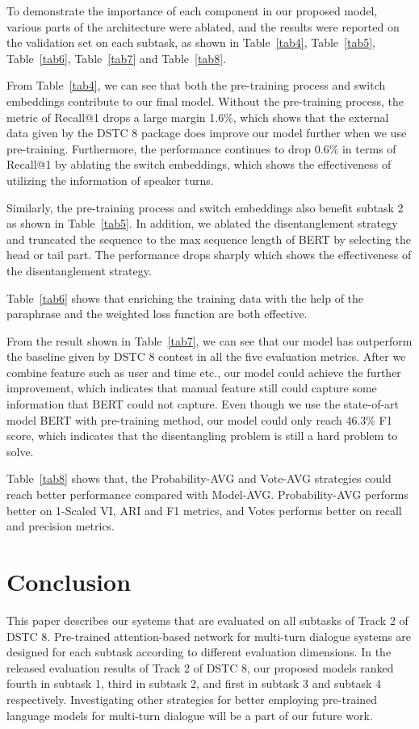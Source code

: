 \documentclass[letterpaper]{article} \usepackage{aaai20}  \usepackage{times}  \usepackage{helvet} \usepackage{courier}  \usepackage[hyphens]{url}  \usepackage{graphicx} \urlstyle{rm} \def\UrlFont{\rm}  \usepackage{graphicx}  \frenchspacing  \setlength{\pdfpagewidth}{8.5in}  \setlength{\pdfpageheight}{11in}
\begin{document}
    To demonstrate the importance of each component in our proposed model, various parts of the architecture were ablated, and the results were reported on the validation set on each subtask, as shown in Table~\ref{tab4}, Table~\ref{tab5}, Table~\ref{tab6}, Table~\ref{tab7} and Table~\ref{tab8}.

    From Table~\ref{tab4}, we can see that both the pre-training process and switch embeddings contribute to our final model.
    Without the pre-training process, the metric of Recall@1 drops a large margin 1.6\%, which shows that the external data given by the DSTC 8 package does improve our model further when we use pre-training.
    Furthermore, the performance continues to drop 0.6\% in terms of Recall@1 by ablating the switch embeddings, which shows the effectiveness of utilizing the information of speaker turns.

    Similarly, the pre-training process and switch embeddings also benefit subtask 2 as shown in Table~\ref{tab5}.
    In addition, we ablated the disentanglement strategy and truncated the sequence to the max sequence length of BERT by selecting the head or tail part.
    The performance drops sharply which shows the effectiveness of the disentanglement strategy.


    Table~\ref{tab6} shows that enriching the training data with the help of the paraphrase and the weighted loss function are both effective.

    From the result shown in Table~\ref{tab7}, we can see that our model has outperform the baseline given by DSTC 8 contest in all the five evaluation metrics.
    After we combine feature such as user and time etc., our model could achieve the further improvement, which indicates that manual feature still could capture some information that BERT could not capture.
    Even though we use the state-of-art model BERT with pre-training method, our model could only reach 46.3\% F1 score, which indicates that the disentangling problem is still a hard problem to solve.

    Table~\ref{tab8} shows that, the Probability-AVG and Vote-AVG strategies could reach better performance compared with Model-AVG.
    Probability-AVG performs better on 1-Scaled VI, ARI and F1 metrics, and Votes performs better on recall and precision metrics.


\section{Conclusion}

  This paper describes our systems that are evaluated on all subtasks of Track 2 of DSTC 8.
  Pre-trained attention-based network for multi-turn dialogue systems are designed for each subtask according to different evaluation dimensions.
  In the released evaluation results of Track 2 of DSTC 8, our proposed models ranked fourth in subtask 1, third in subtask 2, and first in subtask 3 and subtask 4 respectively.
  Investigating other strategies for better employing pre-trained language models for multi-turn dialogue will be a part of our future work.




\end{document}
